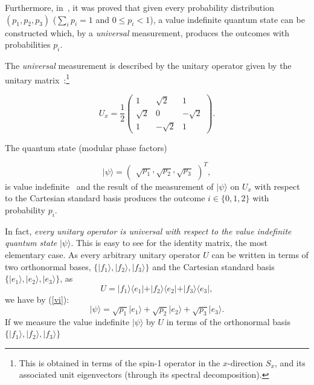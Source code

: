 \documentclass[%
 superscriptaddress,
  preprint,
 showpacs,
 showkeys,
 nofootinbib,
  amsmath,amssymb,
  aps,
 pra,
  longbibliography,
  floatfix,
 ]{revtex4-2}
\theoremstyle{definition}
\begin{document}
Furthermore, in~\cite{RSPA23}, it was proved that
 given every probability distribution $(p_1,p_2,p_3)$ ($\sum_{i}p_i=1$ and $0\le  p_i < 1$), a value indefinite quantum state can be constructed which, by a {\it universal} measurement, produces the
outcomes with probabilities $p_i$.



 The {\it universal} measurement is described
by the unitary operator given by the unitary matrix~\cite{RSPA23}:\footnote{This is obtained in terms of the spin-1 operator in the $x$-direction $S_x$, and its associated unit eigenvectors (through its spectral decomposition).}

\begin{equation}
U_x =\frac{1}{2}
\begin{pmatrix}
1 & \sqrt{2} & 1\\
\sqrt{2} & 0 & -\sqrt{2}\\
1 & -\sqrt{2} & 1
\end{pmatrix}.
\label{2023-ux}
\end{equation}


\noindent The quantum state
(modular phase factors)

\begin{equation}
\label{vi}
\vert \psi \rangle=\begin{pmatrix}\sqrt{p_1},\sqrt{p_2},\sqrt{p_3}\end{pmatrix}^T,
\end{equation}
is value indefinite~\cite[Theorem 4.1.]{RSPA23} and the result of the measurement of $\vert \psi \rangle$ on $U_x$ with respect to the Cartesian standard basis produces the outcome
 $i\in \{0,1,2\}$ with probability $p_i$.

In fact, {\it every unitary operator is universal with respect to the value indefinite quantum state} $\vert \psi \rangle$. This is easy to see for
the identity matrix, the most elementary case.
As every arbitrary unitary operator $U$  can be written in terms of two orthonormal bases,
$\{ \vert f_1 \rangle, \vert f_2 \rangle , \vert f_3 \rangle  \}$
and the  Cartesian standard basis $\{ \vert e_1 \rangle, \vert e_2 \rangle , \vert e_3 \rangle  \}$,
as
$$U=
\vert f_1\rangle \langle e_1\vert +
\vert f_2\rangle \langle e_2\vert +
\vert f_3\rangle \langle e_3\vert ,$$
 we have by (\ref{vi}):
\begin{equation}
\vert \psi \rangle =
\sqrt{p_1}\vert e_1 \rangle + \sqrt{p_2}\vert e_2 \rangle + \sqrt{p_3}\vert e_3 \rangle.
\end{equation}
If we measure the value indefinite $\vert \psi \rangle$ by $U$
in terms of the orthonormal basis
$\{ \vert f_1 \rangle, \vert f_2 \rangle , \vert f_3 \rangle  \}$
\end{document}
